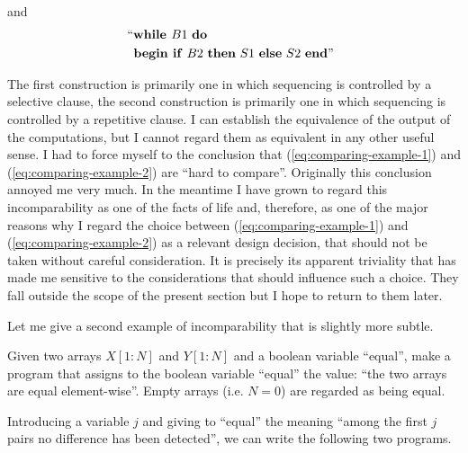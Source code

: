 \noindent
and
\begin{equation}
	\label{eq:comparing-example-2}
	\begin{split}
		&\text{\hspace{-.5em}``\textbf{while }} B1\text{ \textbf{do}}\\
		&\text{\textbf{begin if} } B2\text{ \textbf{then} } S1\text{ \textbf{else} } S2\text{ \textbf{end}''}
	\end{split}
\end{equation}

The first construction is primarily one in which sequencing is controlled by a selective clause, the second construction is primarily one in which sequencing is controlled by a repetitive clause. I can establish the equivalence of the output of the computations, but I cannot regard them as equivalent in any other useful sense. I had to force myself to the conclusion that (\ref{eq:comparing-example-1}) and (\ref{eq:comparing-example-2}) are ``hard to compare''. Originally this conclusion annoyed me very much. In the meantime I have grown to regard this incomparability as one of the facts of life and, therefore, as one of the major reasons why I regard the choice between (\ref{eq:comparing-example-1}) and (\ref{eq:comparing-example-2}) as a relevant design decision, that should not be taken without careful consideration. It is precisely its apparent triviality that has made me sensitive to the considerations that should influence such a choice. They fall outside the scope of the present section but I hope to return to them later.

Let me give a second example of incomparability that is slightly more subtle.

Given two arrays $X[1:N]$ and $Y[1:N]$ and a boolean variable ``equal'', make a program that assigns to the boolean variable ``equal'' the value: ``the two arrays are equal element-wise''. Empty arrays (i.e. $N = 0$) are regarded as being equal.

Introducing a variable $j$ and giving to ``equal'' the meaning ``among the first $j$ pairs no difference has been detected'', we can write the following two programs.
